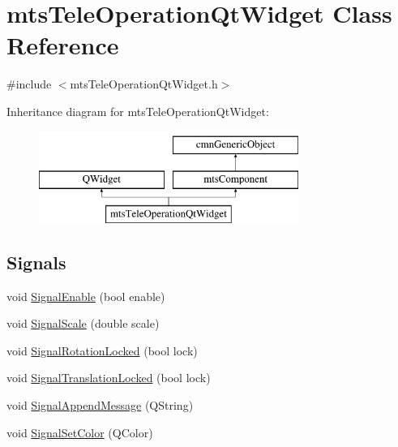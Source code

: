 \hypertarget{classmts_tele_operation_qt_widget}{\section{mts\-Tele\-Operation\-Qt\-Widget Class Reference}
\label{classmts_tele_operation_qt_widget}
}


{\ttfamily \#include $<$mts\-Tele\-Operation\-Qt\-Widget.\-h$>$}

Inheritance diagram for mts\-Tele\-Operation\-Qt\-Widget\-:\begin{figure}[H]
\begin{center}
\leavevmode
\includegraphics[height=3.000000cm]{dc/d7b/classmts_tele_operation_qt_widget}
\end{center}
\end{figure}
\subsection*{Signals}
\begin{DoxyCompactItemize}
\item 
void \hyperlink{classmts_tele_operation_qt_widget_a2f9dea73c9959817c15ef74d16cc307f}{Signal\-Enable} (bool enable)
\item 
void \hyperlink{classmts_tele_operation_qt_widget_a3e4382756e6227da9c7ce37cef2b85b5}{Signal\-Scale} (double scale)
\item 
void \hyperlink{classmts_tele_operation_qt_widget_af440c29d1dbb0092b778d7c1e62ff0be}{Signal\-Rotation\-Locked} (bool lock)
\item 
void \hyperlink{classmts_tele_operation_qt_widget_a761893411ed8e036431887af9e22373c}{Signal\-Translation\-Locked} (bool lock)
\item 
void \hyperlink{classmts_tele_operation_qt_widget_a76959cc3a933694a904cbe28076323ea}{Signal\-Append\-Message} (Q\-String)
\item 
void \hyperlink{classmts_tele_operation_qt_widget_a3bca35cd0f542bfd299e6f2e10ccd9cb}{Signal\-Set\-Color} (Q\-Color)
\end{DoxyCompactItemize}
